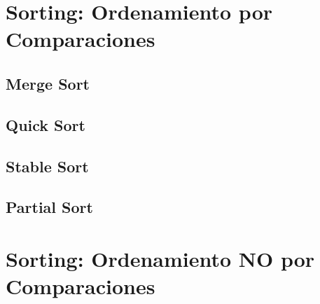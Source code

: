 \documentclass[12pt, fleqn]{report}                             %
\theoremstyle{break}                                            %
\begin{document}
    \clearpage
    \chapter{Sorting: Ordenamiento por Comparaciones}


        \section{Merge Sort}

        \section{Quick Sort}

        \section{Stable Sort}

        \section{Partial Sort}


    \clearpage
    \chapter{Sorting: Ordenamiento NO por Comparaciones}
        
\end{document}
